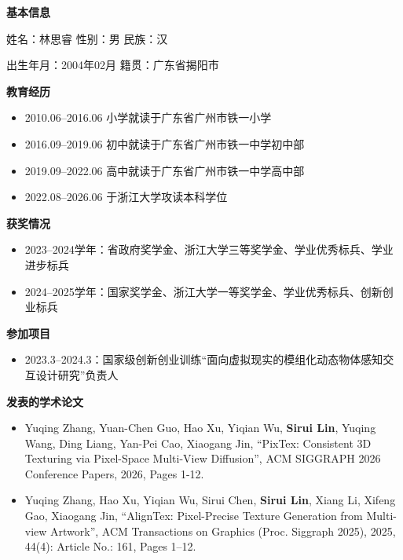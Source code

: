 \cleardoublepage
{}
{
    \textbf{基本信息}

    \noindent 姓名：林思睿 \quad 性别：男 \quad 民族：汉 \quad

    \noindent 出生年月：2004年02月 \quad  籍贯：广东省揭阳市

    \raggedright
    \textbf{教育经历}
    \begin{itemize}
        \setlength{\itemsep}{0pt}
        \setlength{\parskip}{0pt}
        \setlength{\parsep}{0pt}

        \item 2010.06--2016.06 小学就读于广东省广州市铁一小学
        \item 2016.09--2019.06 初中就读于广东省广州市铁一中学初中部
        \item 2019.09--2022.06 高中就读于广东省广州市铁一中学高中部
        \item 2022.08--2026.06 于浙江大学攻读本科学位
    \end{itemize}

    \vspace{0.3em}

    \textbf{获奖情况}
    \begin{itemize}
        \justifying
        \setlength{\itemsep}{0pt}
        \setlength{\parskip}{0pt}
        \setlength{\parsep}{0pt}

        \item 2023--2024学年：省政府奖学金、浙江大学三等奖学金、学业优秀标兵、学业进步标兵
        \item 2024--2025学年：国家奖学金、浙江大学一等奖学金、学业优秀标兵、创新创业标兵
    \end{itemize}
    
    \textbf{参加项目}
     \begin{itemize}
        \setlength{\itemsep}{0pt}
        \setlength{\parskip}{0pt}
        \setlength{\parsep}{0pt}
        \item 2023.3--2024.3：国家级创新创业训练“面向虚拟现实的模组化动态物体感知交互设计研究”负责人
    \end{itemize}
    
    \textbf{发表的学术论文}
    \begin{itemize}
        \justifying
        \setlength{\itemsep}{0pt}
        \setlength{\parskip}{0pt}
        \setlength{\parsep}{0pt}
        \item Yuqing Zhang, Yuan-Chen Guo, Hao Xu, Yiqian Wu, \textbf{Sirui Lin}, Yuqing Wang, Ding Liang, Yan-Pei Cao, Xiaogang Jin, ``PixTex: Consistent 3D Texturing via Pixel-Space Multi-View Diffusion'', ACM SIGGRAPH 2026 Conference Papers, 2026, Pages 1-12.
        \item Yuqing Zhang, Hao Xu, Yiqian Wu, Sirui Chen, \textbf{Sirui Lin}, Xiang Li, Xifeng Gao, Xiaogang Jin, ``AlignTex: Pixel-Precise Texture Generation from Multi-view Artwork'', ACM Transactions on Graphics (Proc. Siggraph 2025), 2025, 44(4): Article No.: 161, Pages 1--12.
    \end{itemize}
}